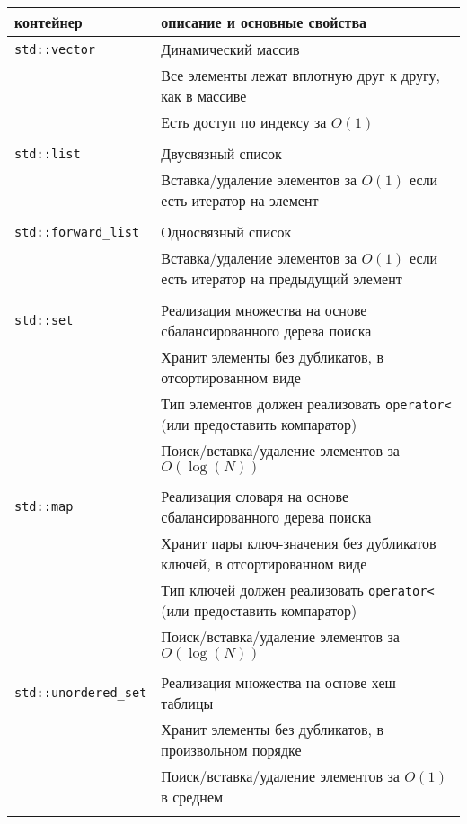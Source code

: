 \documentclass{article}
\begin{document}
\begin{center}
\begin{tabular}{ l | l }
 контейнер & описание и основные свойства \\ \hline


 \texttt{std::vector} & Динамический массив \\
                      & Все элементы лежат вплотную друг к другу, как в массиве \\
                      & Есть доступ по индексу за $O(1)$ \\ \\ \hline
 \texttt{std::list} & Двусвязный список \\
                    & Вставка/удаление элементов за $O(1)$ если есть итератор на элемент \\ \\ \hline
 \texttt{std::forward\_list} & Односвязный список \\
                     & Вставка/удаление элементов за $O(1)$ если есть итератор на предыдущий элемент\\ \\ \hline
 \texttt{std::set} & Реализация множества на основе сбалансированного дерева поиска \\
				   & Хранит элементы без дубликатов, в отсортированном виде\\
				   & Тип элементов должен реализовать \texttt{operator<} (или предоставить компаратор)\\
                   & Поиск/вставка/удаление элементов за $O(\log(N))$ \\ \\ \hline
 \texttt{std::map} & Реализация словаря на основе сбалансированного дерева поиска \\
				   & Хранит пары ключ-значения без дубликатов ключей, в отсортированном виде\\
				   & Тип ключей должен реализовать \texttt{operator<}  (или предоставить компаратор)\\
                   & Поиск/вставка/удаление элементов за $O(\log(N))$ \\ \\ \hline
 \texttt{std::unordered\_set} & Реализация множества на основе хеш-таблицы \\
				   & Хранит элементы без дубликатов, в произвольном порядке\\
                   & Поиск/вставка/удаление элементов за $O(1)$ в среднем \\ \\ \hline

\end{tabular}
\end{center}
\end{document}

